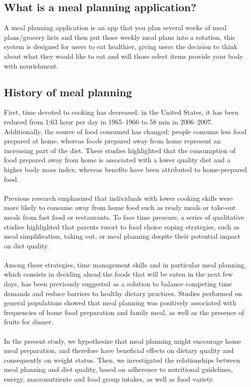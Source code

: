 \subsection{What is a meal planning application?}

A meal planning application is an app that you plan several weeks of meal plans/grocery lists and then put those weekly meal plans into a rotation, this system is designed for users to eat healthier, giving users the decision to think about what they would like to eat and will those select items provide your body with nourishment.

\subsection{History of meal planning}

First, time devoted to cooking has decreased: in the United States, it has been reduced from 1:63 hour per day in 1965–1966 to 58 min in 2006–2007. Additionally, the source of food consumed has changed: people consume less food prepared at home, whereas foods prepared away from home represent an increasing part of the diet. These studies highlighted that the consumption of food prepared away from home is associated with a lower quality diet and a higher body mass index, whereas benefits have been attributed to home-prepared food. \\ \\
Previous research emphasized that individuals with lower cooking skills were more likely to consume away from home food such as ready meals or take-out meals from fast food or restaurants. To face time pressure, a series of qualitative studies highlighted that parents resort to food choice coping strategies, such as meal simplification, taking out, or meal planning despite their potential impact on diet quality. \\ \\
Among these strategies, time management skills and in particular meal planning, which consists in deciding ahead the foods that will be eaten in the next few days, has been previously suggested as a solution to balance competing time demands and reduce barriers to healthy dietary practices. Studies performed on general populations showed that meal planning was positively associated with frequencies of home food preparation and family meal, as well as the presence of fruits for dinner. \\ \\
In the present study, we hypothesize that meal planning might encourage home meal preparation, and therefore have beneficial effects on dietary quality and consequently on weight status. Then, we investigated the relationships between meal planning and diet quality, based on adherence to nutritional guidelines, energy, macronutrients and food group intakes, as well as food variety.

